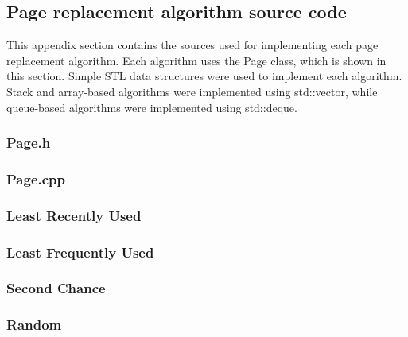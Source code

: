 \documentclass[paper=a4, fontsize=11pt]{scrartcl} %
\numberwithin{equation}{section} %
\numberwithin{figure}{section} %
\numberwithin{table}{section} %
\begin{document}
\subsection{Page replacement algorithm source code}
This appendix section contains the sources used for implementing each page replacement algorithm. Each algorithm uses the Page class, which is shown in this section. Simple STL data structures were used to implement each algorithm. Stack and array-based algorithms were implemented using std::vector, while queue-based algorithms were implemented using std::deque. 

\subsubsection{Page.h}

\subsubsection{Page.cpp}


\subsubsection{Least Recently Used}


\subsubsection{Least Frequently Used}


\subsubsection{Second Chance}


\subsubsection{Random}


\end{document}
